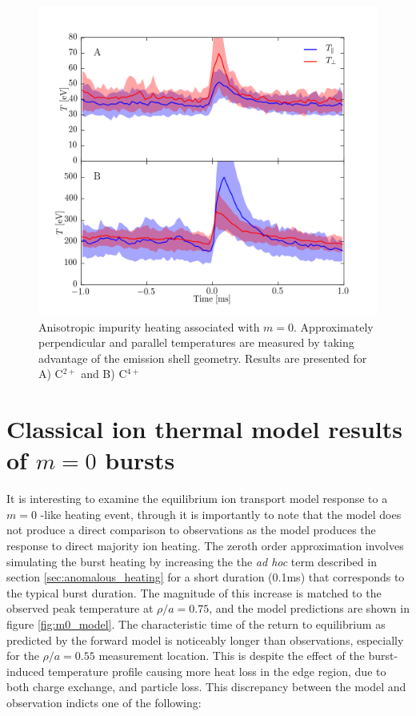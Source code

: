 \begin{refsection}
\begin{figure}
	\centering
	\includegraphics[width = 1.\linewidth]{./m0_and_impurity_heating/m0_anisotropy.png}
	\caption[Anisotropic impurity heating associated with $m = 0$.]{Anisotropic impurity heating associated with $m = 0$. Approximately perpendicular and parallel temperatures are measured by taking advantage of the emission shell geometry. Results are presented for A) C$^{2+}$ and B)  C$^{4+}$}\label{fig:m0_anisotropy}
\end{figure}

\section{Classical ion thermal model results of $m = 0$ bursts}\label{m0_v_model}

It is interesting to examine the equilibrium ion transport model response to a $m = 0$ -like heating event, through it is importantly to note that the model does not produce a direct comparison to observations as the model produces the response to direct majority ion heating. The zeroth order approximation involves simulating the burst heating by increasing the the \textit{ad hoc} term described in section \ref{sec:anomalous_heating} for a short duration (0.1ms) that corresponds to the typical burst duration. The magnitude of this increase is matched to the observed peak temperature at $\rho/a = 0.75$, and the model predictions are shown in figure \ref{fig:m0_model}. The characteristic time of the return to equilibrium as predicted by the forward model is noticeably longer than observations, especially for the $\rho/a = 0.55$ measurement location. This is despite the effect of the burst-induced temperature profile causing more heat loss in the edge region, due to both charge exchange, and particle loss. This discrepancy between the model and observation indicts one of the following:


\end{refsection}
